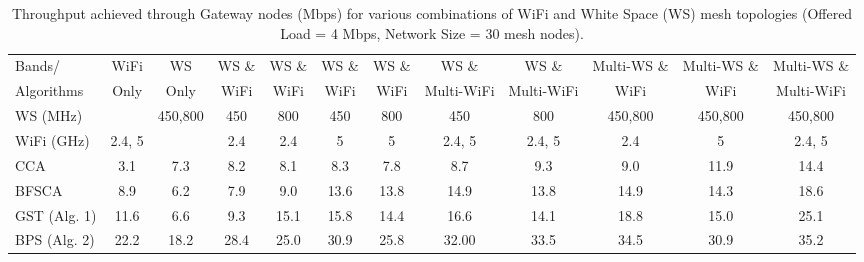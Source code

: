 \begin{table}
\centering %
\begin{tabular}{|l|c|c|c|c|c|c|c|c|c|c|c|} %
\hline %
Bands/     & WiFi    & WS      & WS \& & WS \& &  WS \& & WS \& & WS \&      &  WS \&      & Multi-WS \& & Multi-WS \& & Multi-WS \& \\%
Algorithms & Only    & Only    & WiFi  & WiFi  &  WiFi  & WiFi  & Multi-WiFi &  Multi-WiFi & WiFi        & WiFi        & Multi-WiFi  \\
\hline %
WS (MHz)   &                                                        & 450,800 & 450 &  800  &  450   & 800               & 450    & 800      & 450,800     & 450,800     & 450,800     \\
\hline
WiFi (GHz) & 2.4, 5 &                                                             & 2.4 &  2.4  &  5   & 5               & 2.4, 5& 2.4, 5        & 2.4             & 5         & 2.4, 5     \\ %
\hline
\hline %
CCA~\cite{draves2004routing}                        & 3.1   &  7.3  & 8.2    &8.1    &8.3                &7.8     &   8.7    &   9.3&     9.0             &         11.9     &   14.4          \\      
\hline %
BFSCA~\cite{ramachandran2006interference}  & 8.9   &  6.2  & 7.9    & 9.0   & 13.6       & 13.8   &  14.9    &   13.8&      14.9           &      14.3       &       18.6      \\      
\hline %
GST (Alg. 1)                                                            & 11.6  &   6.6 & 9.3    &   15.1&   15.8        &  14.4  &   16.6   &    14.1  &   18.8            &  15.0           &    25.1         \\      
\hline %
BPS (Alg. 2)                                                            & 22.2  & 18.2  &  28.4  & 25.0  & 30.9          & 25.8   &   32.00  &  33.5       &     34.5            &      30.9       &       35.2      \\      
\hline %
\end{tabular}    
\label{tab:2channelcombination}    
\caption{Throughput achieved through Gateway nodes (Mbps) for various combinations of WiFi and White Space (WS) mesh topologies (Offered Load = 4 Mbps, Network Size = 30 mesh nodes).} %
\vspace{-0.3in}
\end{table}    

